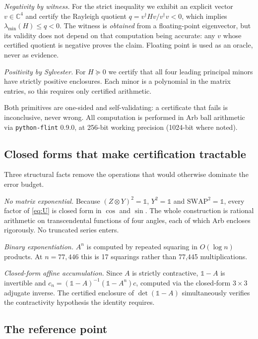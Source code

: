 \documentclass[11pt,a4paper]{article}
\theoremstyle{definition}
\theoremstyle{remark}
\newcommand{\I}{\mathbb{1}}
\begin{document}
\emph{Negativity by witness.} For the strict inequality we exhibit an explicit vector $v \in \mathbb{C}^4$ and certify the Rayleigh quotient $q = v^{\dagger}Hv/v^{\dagger}v < 0$, which implies $\lambda_{\min}(H) \le q < 0$. The witness is \emph{obtained} from a floating-point eigenvector, but its validity does not depend on that computation being accurate: any $v$ whose certified quotient is negative proves the claim. Floating point is used as an oracle, never as evidence.

\emph{Positivity by Sylvester.} For $H \succeq 0$ we certify that all four leading principal minors have strictly positive enclosures. Each minor is a polynomial in the matrix entries, so this requires only certified arithmetic.

Both primitives are one-sided and self-validating: a certificate that fails is inconclusive, never wrong. All computation is performed in Arb ball arithmetic \cite{Arb} via \texttt{python-flint} 0.9.0, at 256-bit working precision (1024-bit where noted).

\subsection{Closed forms that make certification tractable}

Three structural facts remove the operations that would otherwise dominate the error budget.

\emph{No matrix exponential.} Because $(Z \otimes Y)^2 = \I$, $Y^2 = \I$ and $\mathrm{SWAP}^2 = \I$, every factor of \eqref{eq:U} is closed form in $\cos$ and $\sin$. The whole construction is rational arithmetic on transcendental functions of four angles, each of which Arb encloses rigorously. No truncated series enters.

\emph{Binary exponentiation.} $A^n$ is computed by repeated squaring in $O(\log n)$ products. At $n = 77{,}446$ this is 17 squarings rather than 77,445 multiplications.

\emph{Closed-form affine accumulation.} Since $A$ is strictly contractive, $\I-A$ is invertible and $c_n = (\I-A)^{-1}(\I-A^{n})c$, computed via the closed-form $3\times3$ adjugate inverse. The certified enclosure of $\det(\I-A)$ simultaneously verifies the contractivity hypothesis the identity requires.

\subsection{The reference point}
\end{document}
